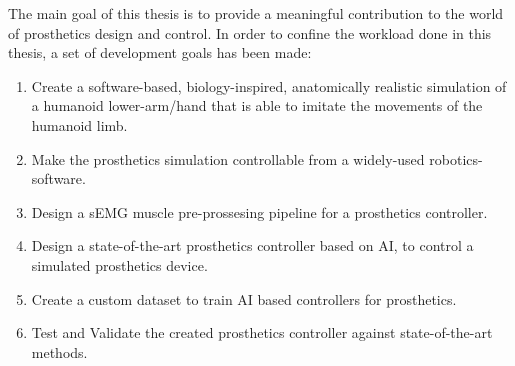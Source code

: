 \documentclass[../main.tex]{subfiles}
\begin{document}
The main goal of this thesis is to provide a meaningful contribution to the world of prosthetics design and control.
In order to confine the workload done in this thesis, a set of development goals has been made:

\begin{enumerate}
\item Create a software-based, biology-inspired, anatomically realistic simulation of a humanoid lower-arm/hand that is able to imitate the movements of the humanoid limb.
\item Make the prosthetics simulation controllable from a widely-used robotics-software.
\item Design a sEMG muscle pre-prossesing pipeline for a prosthetics controller. 
\item Design a state-of-the-art prosthetics controller based on AI, to control a simulated prosthetics device.
\item Create a custom dataset to train AI based controllers for prosthetics.
\item Test and Validate the created prosthetics controller against state-of-the-art methods.
\end{enumerate}
\end{document}
